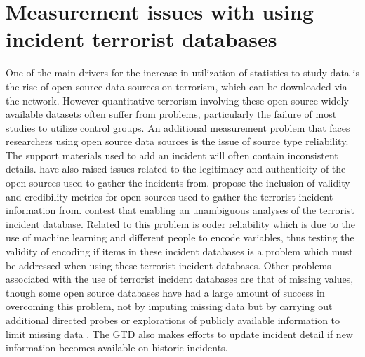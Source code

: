 \section{Measurement issues with using incident terrorist databases} \label{sec:markermeasdif}
One of the main drivers for the increase in utilization of statistics to study data is the rise of open source data sources on terrorism, which can be downloaded via the network. However quantitative terrorism involving these open source widely available datasets often suffer from problems, particularly the failure of most studies to utilize control groups. An additional measurement problem that faces researchers using open source data sources is the issue of source type reliability. The support materials used to add an incident will often contain inconsistent details. \citep{ackerman2016speaking} have also raised issues related to the legitimacy and authenticity of the open sources used to gather the incidents from. \citep{ackerman2016speaking} propose the inclusion of validity and credibility metrics for  open sources used to gather the terrorist incident information from. \citep{ackerman2016speaking} contest that enabling  an unambiguous analyses of the terrorist incident database. Related to this problem is coder reliability which is due to the use of machine learning and different people to encode variables, thus testing the validity of encoding if items in these incident databases is a problem which must be addressed when using these terrorist incident databases. 
Other problems associated with the use of terrorist incident databases are that of missing values, though some open source databases have had a large amount of success in overcoming this problem, not by imputing missing data but by carrying out additional directed  probes or explorations of publicly available information to limit missing data \citep{parkin2012developing}. The GTD also makes efforts to update incident detail if new information becomes available on historic incidents.


